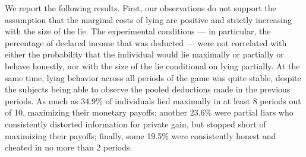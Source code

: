 \documentclass[12pt]{article}
\begin{document}


\par We report the following results. First, our observations do not support the assumption that the marginal costs of lying are positive and strictly increasing with the size of the lie. The experimental conditions --- in particular, the percentage of declared income that was deducted --- were not correlated with either the probability that the individual would lie maximally or partially or behave honestly, nor with the size of the lie conditional on lying partially. At the same time, lying behavior across all periods of the game was quite stable, despite the subjects being able to observe the pooled deductions made in the previous periods. As much as 34.9\% of individuals lied maximally in at least 8 periods out of 10, maximizing their monetary payoffs; another 23.6\% were partial liars who consistently distorted information for private gain, but stopped short of maximizing their payoffs; finally, some 19.5\% were consistently honest and cheated in no more than 2 periods.\footnotemark{}
\end{document}
